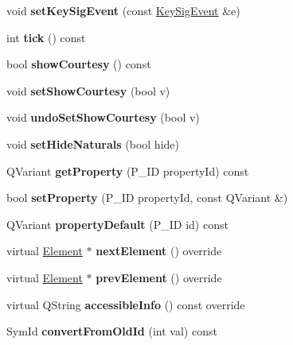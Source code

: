\begin{DoxyCompactItemize}
\item 
\mbox{\label{class_ms_1_1_key_sig_aaaf4f96a1788a5bdb3689dc2df8fb60d}} 
void {\bfseries set\+Key\+Sig\+Event} (const \hyperlink{class_ms_1_1_key_sig_event}{Key\+Sig\+Event} \&e)
\item 
\mbox{\label{class_ms_1_1_key_sig_a01aa4a4a477b1ee7449e358d425e3b1d}} 
int {\bfseries tick} () const
\item 
\mbox{\label{class_ms_1_1_key_sig_ae86100386edc3a5b7445b4c3d7cee79a}} 
bool {\bfseries show\+Courtesy} () const
\item 
\mbox{\label{class_ms_1_1_key_sig_a754d46597fabc130c535fa62ec782133}} 
void {\bfseries set\+Show\+Courtesy} (bool v)
\item 
\mbox{\label{class_ms_1_1_key_sig_a7dbec286817957b50743ddd8ec6ef999}} 
void {\bfseries undo\+Set\+Show\+Courtesy} (bool v)
\item 
\mbox{\label{class_ms_1_1_key_sig_a4efa800c2d7bf0e669ddce813650b7b2}} 
void {\bfseries set\+Hide\+Naturals} (bool hide)
\item 
\mbox{\label{class_ms_1_1_key_sig_a7bef6af1f7ad82d079eccfeb6ef87f0c}} 
Q\+Variant {\bfseries get\+Property} (P\+\_\+\+ID property\+Id) const
\item 
\mbox{\label{class_ms_1_1_key_sig_a1113220498d9085822d9e6e2e08aed0c}} 
bool {\bfseries set\+Property} (P\+\_\+\+ID property\+Id, const Q\+Variant \&)
\item 
\mbox{\label{class_ms_1_1_key_sig_a8064beea19ada97d1d444263c7f5035e}} 
Q\+Variant {\bfseries property\+Default} (P\+\_\+\+ID id) const
\item 
\mbox{\label{class_ms_1_1_key_sig_a6a2fa355e2a688fddcab8c8795607f52}} 
virtual \hyperlink{class_ms_1_1_element}{Element} $\ast$ {\bfseries next\+Element} () override
\item 
\mbox{\label{class_ms_1_1_key_sig_a7553106cdc3f3114dc6d392145bc0fae}} 
virtual \hyperlink{class_ms_1_1_element}{Element} $\ast$ {\bfseries prev\+Element} () override
\item 
\mbox{\label{class_ms_1_1_key_sig_a1b8ee6c4209142b232f93ef904259cc3}} 
virtual Q\+String {\bfseries accessible\+Info} () const override
\item 
\mbox{\label{class_ms_1_1_key_sig_ab6ece3ae748ec1369eae8c02aef16c15}} 
Sym\+Id {\bfseries convert\+From\+Old\+Id} (int val) const
\end{DoxyCompactItemize}
